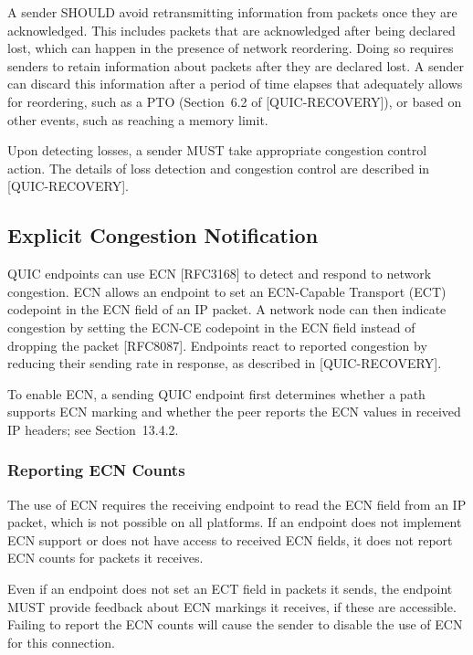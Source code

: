 \documentclass{article}
\begin{document}
\begin{itemize}
A sender SHOULD avoid retransmitting information from packets once they are acknowledged.  This includes packets that are acknowledged after being declared lost, which can happen in the presence of network reordering.  Doing so requires senders to retain information about packets after they are declared lost.  A sender can discard this information after a period of time elapses that adequately allows for reordering, such as a PTO (Section~6.2 of [QUIC-RECOVERY]), or based on other events, such as reaching a memory limit.

Upon detecting losses, a sender MUST take appropriate congestion control action.  The details of loss detection and congestion control are described in [QUIC-RECOVERY].

\end{itemize}
\subsection{Explicit Congestion Notification}

QUIC endpoints can use ECN [RFC3168] to detect and respond to network congestion.  ECN allows an endpoint to set an ECN-Capable Transport (ECT) codepoint in the ECN field of an IP packet.  A network node can then indicate congestion by setting the ECN-CE codepoint in the ECN field instead of dropping the packet [RFC8087].  Endpoints react to reported congestion by reducing their sending rate in response, as described in [QUIC-RECOVERY].

To enable ECN, a sending QUIC endpoint first determines whether a path supports ECN marking and whether the peer reports the ECN values in received IP headers; see Section~13.4.2.

\subsubsection{Reporting ECN Counts}

The use of ECN requires the receiving endpoint to read the ECN field from an IP packet, which is not possible on all platforms.  If an endpoint does not implement ECN support or does not have access to received ECN fields, it does not report ECN counts for packets it receives.

Even if an endpoint does not set an ECT field in packets it sends, the endpoint MUST provide feedback about ECN markings it receives, if these are accessible.  Failing to report the ECN counts will cause the sender to disable the use of ECN for this connection.
\end{document}
